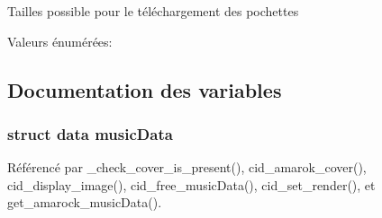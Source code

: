Tailles possible pour le téléchargement des pochettes \begin{Desc}
\item[Valeurs énumérées: ]\par
\begin{description}
\item[{\em 
MEDIUM\_\-IMAGE\label{cid-struct_8h_abe9b2938e57ce207b429148c6b8a76f514582d7fc683d265577b669ba240de2}
}]\item[{\em 
LARGE\_\-IMAGE\label{cid-struct_8h_abe9b2938e57ce207b429148c6b8a76f1d6059852bd6961e00626a3953389f28}
}]\end{description}
\end{Desc}



\subsection{Documentation des variables}
\subsubsection{\setlength{\rightskip}{0pt plus 5cm}struct {\bf data}  {\bf musicData}}\label{cid-struct_8h_5524932604a0680d7ad54d851104e740}




Référencé par \_\-check\_\-cover\_\-is\_\-present(), cid\_\-amarok\_\-cover(), cid\_\-display\_\-image(), cid\_\-free\_\-musicData(), cid\_\-set\_\-render(), et get\_\-amarock\_\-musicData().
